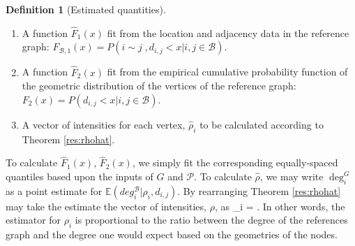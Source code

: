 \documentclass[11]{article}
\newcommand{\sanote}{\todo[color=violet!30]}
\def\ba #1\ea{\begin{align} #1 \end{align}}
\def\bas #1\eas{\begin{align*} #1 \end{align*}}
\newcommand{\rB}{\mathcal{B}}
\theoremstyle{remark}
\theoremstyle{definition}
\newtheorem{dfn}[thm]{Definition}
\begin{document}
\begin{dfn}[Estimated quantities] ~\\
\begin{enumerate} 
\item A function $\hat{F}_1(x)$ fit from the location and adjacency data in the reference graph: $F_{\rB, 1}(x) = P(i\sim j \;, d_{i,j}<x| i,j \in\rB)$.

\item A function $\hat F_2(x)$ fit from the empirical cumulative probability function of the geometric distribution of the vertices of the reference graph: $F_2(x) = P( d_{i,j}<x| i,j \in\rB)$. 

\item A vector of intensities for each vertex, $\hat \rho_i$ to be calculated according to Theorem \ref{res:rhohat}.
\end{enumerate}
\end{dfn}
\begin{comment}    
\item A function $\hat{F}_1(x)$ modelling $F_{\rB, 1}(x) = P(i\sim j \;, d_{i,j}<x| i,j \in\rB)$. For our purposes we will estimate $F_1$ as a scaled logistic function: 
\bas \hat{F}_1(x) = \frac{\varepsilon}{1+exp(\alpha_1 + \beta_1 x)}\eas to be fit from the location and adjacency data of the reference graph.

\item A function $\hat F_2(x)$ modelling $F_2(x) = P( d_{i,j}<x| i,j \in\rB)$, cumulative probability function of the geometric distribution of the vertices. As with $F_1$, we will take $\hat{F}_2(x)$ to be a scaled logistic function: \bas \hat F_2(x) = \frac{1}{1+exp(\alpha_2 + \beta_2 x)} \eas also to be fit from the location data of the reference graph. 

\item A vector of intensities for each vertex, $\hat \rho_i$.\end{comment}




To calculate $\hat F_1(x)$, $\hat F_2(x)$, we simply fit the corresponding equally-spaced quantiles based upon the inputs of $G$ and $\mathcal{P}$. To calculate $\hat \rho$, we may write $\deg_i^G$ as a point estimate for $\mathbb{E}(deg_i^\rB | \rho_i, d_{i,j})$. By rearranging Theorem \ref{res:rhohat} may take the estimate the vector of intensities, $\rho$, as 
\ba \hat\rho_i =  . \label{eq:rhohat} \ea
In other words, the estimator for $\rho_i$ is proportional to the ratio between the degree of the references graph and the degree one would expect based on the geometries of the nodes. 
\end{document}
